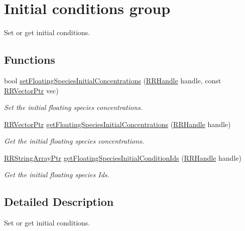 \hypertarget{group__initial_conditions}{\section{Initial conditions group}
\label{group__initial_conditions}
}


Set or get initial conditions.  


\subsection*{Functions}
\begin{DoxyCompactItemize}
\item 
bool \hyperlink{group__initial_conditions_ga48bea9d12449568647e4f0fc6ea22b3a}{set\-Floating\-Species\-Initial\-Concentrations} (\hyperlink{rrc__types_8h_a1d68f0592372208fa5a5f2799ea4b3ae}{R\-R\-Handle} handle, const \hyperlink{rrc__types_8h_a3be72d6006034fd349f753d2bf441bf7}{R\-R\-Vector\-Ptr} vec)
\begin{DoxyCompactList}\small\item\em Set the initial floating species concentrations. \end{DoxyCompactList}\item 
\hyperlink{rrc__types_8h_a3be72d6006034fd349f753d2bf441bf7}{R\-R\-Vector\-Ptr} \hyperlink{group__initial_conditions_ga2f4703d54375cb17e20887df4eb90032}{get\-Floating\-Species\-Initial\-Concentrations} (\hyperlink{rrc__types_8h_a1d68f0592372208fa5a5f2799ea4b3ae}{R\-R\-Handle} handle)
\begin{DoxyCompactList}\small\item\em Get the initial floating species concentrations. \end{DoxyCompactList}\item 
\hyperlink{rrc__types_8h_a7c9475df6c7337d99482b13a365e7596}{R\-R\-String\-Array\-Ptr} \hyperlink{group__initial_conditions_ga0839c13a84160df0f2b94e9aef0be5b6}{get\-Floating\-Species\-Initial\-Condition\-Ids} (\hyperlink{rrc__types_8h_a1d68f0592372208fa5a5f2799ea4b3ae}{R\-R\-Handle} handle)
\begin{DoxyCompactList}\small\item\em Get the initial floating species Ids. \end{DoxyCompactList}\end{DoxyCompactItemize}


\subsection{Detailed Description}
Set or get initial conditions. 

